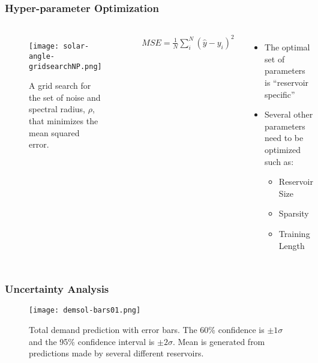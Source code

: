 \begin{frame}
  \frametitle{Hyper-parameter Optimization}
  \begin{columns}
    \column[t]{5cm}
      \begin{figure}
        \texttt{[image: solar-angle-gridsearchNP.png]}
        \caption{A grid search for the set of noise and spectral radius, $\rho$, that minimizes the mean squared error.}
        \label{fig:gridsearch}
      \end{figure}
    \column[t]{5cm}
      \vspace{1cm}
      \begin{align}
        MSE = \frac{1}{N}\sum_i^N(\hat y - y_i)^2
      \end{align}

      \begin{itemize}
        \item The optimal set of parameters is ``reservoir specific''
        \item Several other parameters need to be optimized such as:
          \begin{itemize}
            \item Reservoir Size
            \item Sparsity
            \item Training Length
          \end{itemize}
      \end{itemize}
  \end{columns}
\end{frame}

\begin{frame}
  \frametitle{Uncertainty Analysis}
  \begin{figure}
    \centering
    \texttt{[image: demsol-bars01.png]}
    \caption{Total demand prediction with error bars. The 60\% confidence is $\pm 1\sigma$ and the 95\% confidence interval is $\pm 2\sigma$. Mean is generated from predictions made by several different reservoirs.}
    \label{fig:uncertainty}
  \end{figure}
\end{frame}
